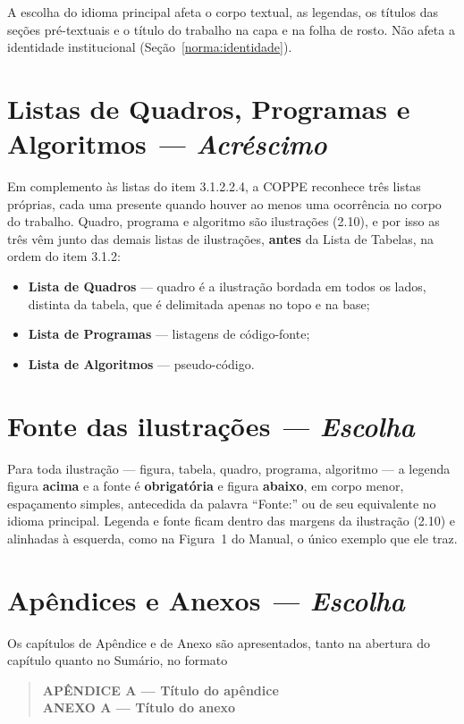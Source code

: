 \documentclass[a4paper,11pt]{article}
\newcommand\tipo[1]{\normalfont\textit{--- #1}}
\begin{document}
A escolha do idioma principal afeta o corpo textual, as legendas, os títulos das
seções pré-textuais e o título do trabalho na capa e na folha de rosto. Não
afeta a identidade institucional (Seção~\ref{norma:identidade}).

\section{Listas de Quadros, Programas e Algoritmos \tipo{Acréscimo}}

Em complemento às listas do item 3.1.2.2.4, a COPPE reconhece três listas
próprias, cada uma presente quando houver ao menos uma ocorrência no corpo do
trabalho. Quadro, programa e algoritmo são ilustrações (2.10), e por isso as
três vêm junto das demais listas de ilustrações, \textbf{antes} da Lista de
Tabelas, na ordem do item 3.1.2:

\begin{itemize}[nosep]
  \item \textbf{Lista de Quadros} --- quadro é a ilustração bordada em todos os
    lados, distinta da tabela, que é delimitada apenas no topo e na base;
  \item \textbf{Lista de Programas} --- listagens de código-fonte;
  \item \textbf{Lista de Algoritmos} --- pseudo-código.
\end{itemize}

\section{Fonte das ilustrações \tipo{Escolha}}

Para toda ilustração --- figura, tabela, quadro, programa, algoritmo --- a
legenda figura \textbf{acima} e a fonte é \textbf{obrigatória} e figura
\textbf{abaixo}, em corpo menor, espaçamento simples, antecedida da palavra
``Fonte:'' ou de seu equivalente no idioma principal. Legenda e fonte ficam
dentro das margens da ilustração (2.10) e alinhadas à esquerda, como na Figura~1
do Manual, o único exemplo que ele traz.

\section{Apêndices e Anexos \tipo{Escolha}}

Os capítulos de Apêndice e de Anexo são apresentados, tanto na abertura do
capítulo quanto no Sumário, no formato

\begin{quote}
  \textbf{APÊNDICE A --- Título do apêndice}\\
  \textbf{ANEXO A --- Título do anexo}
\end{quote}
\end{document}
